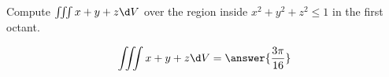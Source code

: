 \documentclass{ximera}
\author{David Guichard \and Neal Koblitz \and H. Jerome Keisler \and Albert Scheller \and Barry Balof \and Mike Wills \and Matthew Carr}
\begin{document}
\begin{exercise}





Compute $\iiint x+y+z\d V$ over the region inside $x^2+y^2+z^2\le 1$ in the first octant.

\begin{prompt}
\[
\iiint x+y+z\d V=\answer{\frac{3\pi}{16}}
\]
\end{prompt}



\end{exercise}
\end{document}
